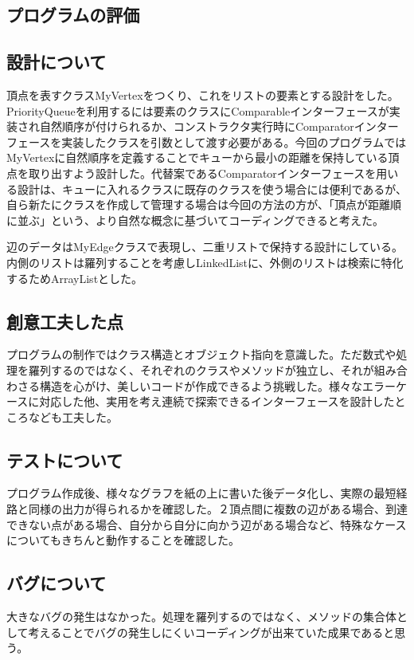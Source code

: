 \documentclass[a4j]{jarticle}
\begin{document}
\begin{description}
\begin{description}

\section{プログラムの評価}

\subsection{設計について}
頂点を表すクラスMyVertexをつくり、これをリストの要素とする設計をした。
PriorityQueueを利用するには要素のクラスにComparableインターフェースが実装され自然順序が付けられるか、コンストラクタ実行時にComparatorインターフェースを実装したクラスを引数として渡す必要がある。今回のプログラムではMyVertexに自然順序を定義することでキューから最小の距離を保持している頂点を取り出すよう設計した。代替案であるComparatorインターフェースを用いる設計は、キューに入れるクラスに既存のクラスを使う場合には便利であるが、自ら新たにクラスを作成して管理する場合は今回の方法の方が、「頂点が距離順に並ぶ」という、より自然な概念に基づいてコーディングできると考えた。

辺のデータはMyEdgeクラスで表現し、二重リストで保持する設計にしている。内側のリストは羅列することを考慮しLinkedListに、外側のリストは検索に特化するためArrayListとした。
\subsection{創意工夫した点}
プログラムの制作ではクラス構造とオブジェクト指向を意識した。ただ数式や処理を羅列するのではなく、それぞれのクラスやメソッドが独立し、それが組み合わさる構造を心がけ、美しいコードが作成できるよう挑戦した。様々なエラーケースに対応した他、実用を考え連続で探索できるインターフェースを設計したところなども工夫した。
\subsection{テストについて}
プログラム作成後、様々なグラフを紙の上に書いた後データ化し、実際の最短経路と同様の出力が得られるかを確認した。２頂点間に複数の辺がある場合、到達できない点がある場合、自分から自分に向かう辺がある場合など、特殊なケースについてもきちんと動作することを確認した。
\subsection{バグについて}
大きなバグの発生はなかった。処理を羅列するのではなく、メソッドの集合体として考えることでバグの発生しにくいコーディングが出来ていた成果であると思う。

\end{description}
\end{description}
\end{document}
